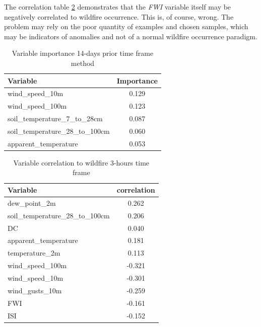 The correlation table \ref{14_days_prior_correlation} demonstrates that the \textit{FWI} variable itself may be negatively correlated to wildfire occurrence. This is, of course, wrong. The problem may rely on the poor quantity of examples and chosen samples, which may be indicators of anomalies and not of a normal wildfire occurrence paradigm.

\begin{table}[H]
	\centering
	\caption{Variable importance 14-days prior time frame method}
	\begin{tabular}{lc}
		\hline
		Variable                         & \multicolumn{1}{l}{Importance} \\ \hline
		wind\_speed\_10m & 0.129                          \\
		wind\_speed\_100m                 & 0.123                          \\
		soil\_temperature\_7\_to\_28cm            & 0.087                          \\
		soil\_temperature\_28\_to\_100cm           & 0.060                          \\
		apparent\_temperature   & 0.053                         
	\end{tabular}
	\label{14_days_prior_importance}
\end{table}

\begin{table}[H]
	\caption{Variable correlation to wildfire 3-hours time frame}
	\centering
	\label{14_days_prior_correlation}
	\begin{tabular}{lc}
		\hline
		Variable                       & \multicolumn{1}{l}{correlation} \\ \hline
		dew\_point\_2m                             & 0.262                         \\
		soil\_temperature\_28\_to\_100cm                            & 0.206                          \\
		DC & 0.040                          \\
		apparent\_temperature                            & 0.181                          \\
		temperature\_2m              & 0.113   \\
		wind\_speed\_100m & -0.321 \\
		wind\_speed\_10m & -0.301 \\
		wind\_gusts\_10m & -0.259 \\
		FWI & -0.161 \\
		ISI & -0.152 \\                   
	\end{tabular}
\end{table}

